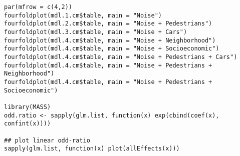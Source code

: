 \documentclass[11pt]{article}
\begin{document}
\begin{verbatim}
par(mfrow = c(4,2))
fourfoldplot(mdl.1.cm$table, main = "Noise")
fourfoldplot(mdl.2.cm$table, main = "Noise + Pedestrians")
fourfoldplot(mdl.3.cm$table, main = "Noise + Cars")
fourfoldplot(mdl.4.cm$table, main = "Noise + Neighborhood")
fourfoldplot(mdl.4.cm$table, main = "Noise + Socioeconomic")
fourfoldplot(mdl.4.cm$table, main = "Noise + Pedestrians + Cars")
fourfoldplot(mdl.4.cm$table, main = "Noise + Pedestrians + Neighborhood")
fourfoldplot(mdl.4.cm$table, main = "Noise + Pedestrians + Socioeconomic")

library(MASS)
odd.ratio <- sapply(glm.list, function(x) exp(cbind(coef(x), confint(x))))

## plot linear odd-ratio
sapply(glm.list, function(x) plot(allEffects(x)))
\end{verbatim}
\end{document}

